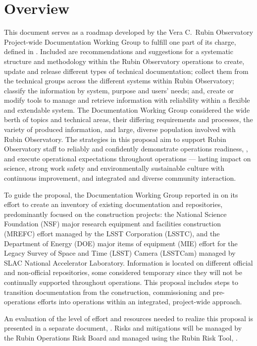 \section{Overview}

This document serves as a roadmap developed by the Vera C.\ Rubin Observatory Project-wide Documentation Working Group to fulfill one part of its charge,  defined in .
Included are recommendations and suggestions for a systematic structure and methodology within the Rubin Observatory operations to create, update and release different types of technical documentation; collect them from the technical groups across the different systems within Rubin Observatory; classify the information by system, purpose and users' needs; and, create or modify tools to manage and retrieve information with reliability within a flexible and extendable system.
The Documentation Working Group considered the wide berth of topics and technical areas, their differing requirements and processes, the variety of produced information, and large, diverse population involved with Rubin Observatory.
The strategies in this proposal aim to support Rubin Observatory staff to reliably and confidently demonstrate operations readiness, ,  and execute operational expectations throughout operations --- lasting impact on science, strong work safety and environmentally sustainable culture with continuous improvement, and integrated and diverse community interaction.

To guide the proposal, the Documentation Working Group reported in  on its effort to create an inventory of existing documentation and repositories,  predominantly focused on the construction projects: the National Science Foundation (NSF) major research equipment and facilities construction (MREFC) effort managed by the LSST Corporation (LSSTC), and the Department of Energy (DOE) major items of equipment (MIE) effort for the Legacy Survey of Space and Time (LSST) Camera (LSSTCam) managed by SLAC National Accelerator Laboratory.
Information is located on different official and non-official repositories, some considered temporary since they will not be continually supported throughout operations.
This proposal includes steps to transition documentation from the construction, commissioning and pre-operations efforts into operations within an integrated, project-wide approach.

An evaluation of the level of effort and resources needed to realize this proposal is presented in a separate document, . 
Risks and mitigations will be managed by the Rubin Operations Risk Board and managed using the Rubin Risk Tool, .

